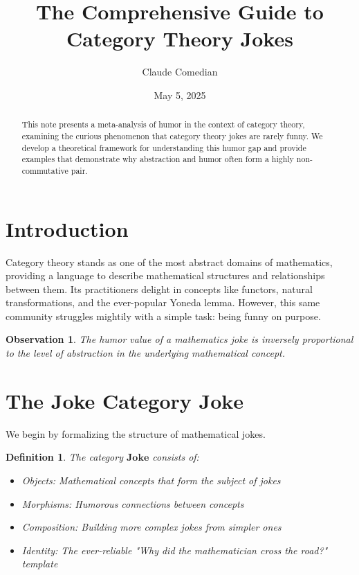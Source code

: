 \documentclass{article}
\title{The Comprehensive Guide to Category Theory Jokes}
\author{Claude Comedian}
\date{May 5, 2025}
\newtheorem{definition}{Definition}
\newtheorem{observation}{Observation}
\begin{document}
\maketitle

\begin{abstract}
    This note presents a meta-analysis of humor in the context of category theory, examining the curious phenomenon that category theory jokes are rarely funny. We develop a theoretical framework for understanding this humor gap and provide examples that demonstrate why abstraction and humor often form a highly non-commutative pair.
\end{abstract}

\section{Introduction}

Category theory stands as one of the most abstract domains of mathematics, providing a language to describe mathematical structures and relationships between them. Its practitioners delight in concepts like functors, natural transformations, and the ever-popular Yoneda lemma. However, this same community struggles mightily with a simple task: being funny on purpose.

\begin{observation}
    The humor value of a mathematics joke is inversely proportional to the level of abstraction in the underlying mathematical concept.
\end{observation}

\section{The Joke Category $\mathbf{Joke}$}

We begin by formalizing the structure of mathematical jokes.

\begin{definition}
    The category $\mathbf{Joke}$ consists of:
    \begin{itemize}
        \item Objects: Mathematical concepts that form the subject of jokes
        \item Morphisms: Humorous connections between concepts
        \item Composition: Building more complex jokes from simpler ones
        \item Identity: The ever-reliable "Why did the mathematician cross the road?" template
    \end{itemize}
\end{definition}
\end{document}
